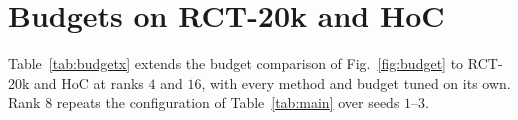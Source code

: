 \documentclass[conference,onecolumn]{IEEEtran}
\begin{document}

\section{Budgets on RCT-20k and HoC}
\label{app:budgetx}
Table~\ref{tab:budgetx} extends the budget comparison of Fig.~\ref{fig:budget}
to RCT-20k and HoC at ranks $4$ and $16$, with every method and budget tuned on
its own. Rank $8$ repeats the configuration of Table~\ref{tab:main} over seeds
$1$--$3$.




\end{document}
